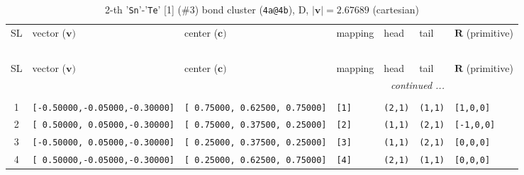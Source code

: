 \documentclass[fleqn,10pt,landscape]{jsarticle}
\begin{document}
\begin{longtable}[l]{cllllll}
\captionsetup{justification=raggedright, singlelinecheck=off}
\caption{2-th '\texttt{Sn}'-'\texttt{Te}' [1] (\#3) bond cluster (\texttt{4a@4b}), D, $|\bm{v}|=2.67689$ (cartesian)}
 \\
 \hline \hline
SL & vector ($\bm{v})$ & center ($\bm{c})$ & mapping & head & tail & $\bm{R}$ (primitive) \\ \hline \endfirsthead

\multicolumn{6}{l}{\tablename\ \thetable{}} \\
 \hline \hline
SL & vector ($\bm{v})$ & center ($\bm{c})$ & mapping & head & tail & $\bm{R}$ (primitive) \\ \hline \endhead

 \hline \hline
\multicolumn{6}{r}{\footnotesize\it continued ...} \\ \endfoot

 \hline \hline
\multicolumn{6}{r}{} \\ \endlastfoot

1 & \texttt{[-0.50000,-0.05000,-0.30000]} & \texttt{[ 0.75000, 0.62500, 0.75000]} & \texttt{[1]} & \texttt{(2,1)} & \texttt{(1,1)} & \texttt{[1,0,0]} \\ \hline
2 & \texttt{[ 0.50000, 0.05000,-0.30000]} & \texttt{[ 0.75000, 0.37500, 0.25000]} & \texttt{[2]} & \texttt{(1,1)} & \texttt{(2,1)} & \texttt{[-1,0,0]} \\ \hline
3 & \texttt{[-0.50000, 0.05000,-0.30000]} & \texttt{[ 0.25000, 0.37500, 0.25000]} & \texttt{[3]} & \texttt{(1,1)} & \texttt{(2,1)} & \texttt{[0,0,0]} \\ \hline
4 & \texttt{[ 0.50000,-0.05000,-0.30000]} & \texttt{[ 0.25000, 0.62500, 0.75000]} & \texttt{[4]} & \texttt{(2,1)} & \texttt{(1,1)} & \texttt{[0,0,0]} \\
\end{longtable}
\renewcommand{\arraystretch}{1.6}
\end{document}
